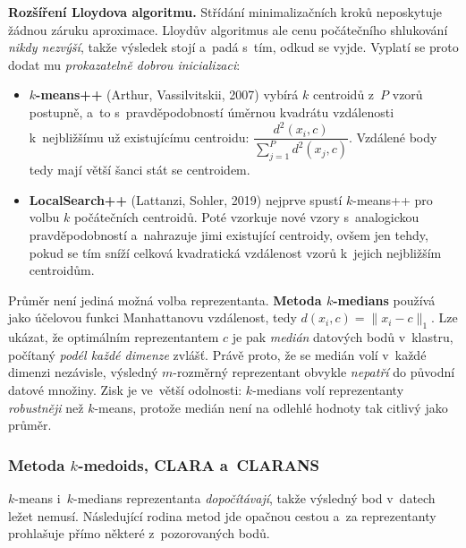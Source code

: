 \documentclass[11pt,a4paper]{article}
\theoremstyle{definition}
\begin{document}
\textbf{Rozšíření Lloydova algoritmu.} Střídání minimalizačních kroků neposkytuje žádnou
záruku aproximace. Lloydův algoritmus ale cenu počátečního shlukování \emph{nikdy nezvýší},
takže výsledek stojí a~padá s~tím, odkud se vyjde. Vyplatí se proto dodat mu
\emph{prokazatelně dobrou inicializaci}:
\begin{itemize}
\item \textbf{$k$-means++} (Arthur, Vassilvitskii, 2007) vybírá $k$ centroidů z~$P$ vzorů
      postupně, a~to s~pravděpodobností úměrnou kvadrátu vzdálenosti k~nejbližšímu už
      existujícímu centroidu:
      $\dfrac{d^2(x_i,c)}{\sum_{j=1}^{P}d^2(x_j,c)}$. Vzdálené body tedy mají větší šanci
      stát se centroidem.
\item \textbf{LocalSearch++} (Lattanzi, Sohler, 2019) nejprve spustí $k$-means++ pro volbu $k$
      počátečních centroidů. Poté vzorkuje nové vzory s~analogickou pravděpodobností
      a~nahrazuje jimi existující centroidy, ovšem jen tehdy, pokud se tím sníží celková
      kvadratická vzdálenost vzorů k~jejich nejbližším centroidům.
\end{itemize}

Průměr není jediná možná volba reprezentanta. \textbf{Metoda $k$-medians} používá jako
účelovou funkci Manhattanovu vzdálenost, tedy $d(x_i,c)=\|x_i-c\|_1$. Lze ukázat, že
optimálním reprezentantem $c$ je pak \emph{medián} datových bodů v~klastru, počítaný
\emph{podél každé dimenze} zvlášť. Právě proto, že se medián volí v~každé dimenzi nezávisle,
výsledný $m$-rozměrný reprezentant obvykle \emph{nepatří} do původní datové množiny. Zisk je
ve~větší odolnosti: $k$-medians volí reprezentanty \emph{robustněji} než $k$-means, protože
medián není na odlehlé hodnoty tak citlivý jako průměr.

\subsubsection{Metoda $k$-medoids, CLARA a~CLARANS}

$k$-means i~$k$-medians reprezentanta \emph{dopočítávají}, takže výsledný bod v~datech ležet
nemusí. Následující rodina metod jde opačnou cestou a~za reprezentanty prohlašuje přímo
některé z~pozorovaných bodů.
\end{document}
